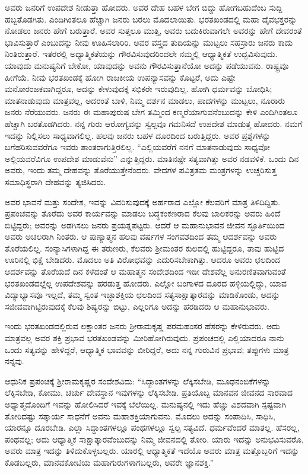 ಅವರು ಜನರಿಗೆ ಉಪದೇಶ ನೀಡುತ್ತಾ ಹೋದರು. ಅವರ ದೇಹ ಬಹಳ ಬೇಗ ಬಿದ್ದು ಹೋಗಬಹುದೆಂಬ ಸುದ್ದಿ ಹಬ್ಬತೊಡಗಿತು. ಎಂದಿಗಿಂತಲೂ ಹೆಚ್ಚಾಗಿ ಜನರು ಬರಲು ಮೊದಲಾಯಿತು. ಭರತಖಂಡದಲ್ಲಿ ಮಹಾ ದೈವಭಕ್ತರನ್ನು ನೋಡಲು ಜನರು ಹೇಗೆ ಬರುತ್ತಾರೆ. ಅವರ ಸುತ್ತಲೂ ಮುತ್ತಿ, ಅವರು ಬದುಕಿರುವಾಗಲೇ ಅವರನ್ನು ಹೇಗೆ ದೇವರಂತೆ ಭಾವಿಸುತ್ತಾರೆ ಎಂಬುದನ್ನು ನೀವು ಊಹಿಸಲಾರಿರಿ. ಅವರ ವಸ್ತ್ರದ ತುದಿಯನ್ನು ಮುಟ್ಟಲು ಸಹಸ್ರಾರು ಜನರು ಕಾದು ನಿಂತಿರುತ್ತಾರೆ. ಇತರರಲ್ಲಿ ಅಧ್ಯಾತ್ಮಿಕತೆಯನ್ನು ಗೌರವಿಸುವುದರಿಂದಲೇ ನಮ್ಮಲ್ಲಿ ಆಧ್ಯಾತ್ಮಿಕತೆ ಉದ್ಭವಿಸುವುದು. ಯಾವುದು ಮನುಷ್ಯನಿಗೆ ಬೇಕೋ, ಯಾವುದನ್ನು ಅವನು ಗೌರವಿಸುತ್ತಾನೆಯೋ ಅದನ್ನು ಪಡೆಯುವನು. ರಾಷ್ಟ್ರವೂ ಹೀಗೆಯೆ. ನೀವು ಭರತಖಂಡಕ್ಕೆ ಹೋಗಿ ರಾಜಕೀಯ ಉಪನ್ಯಾಸವನ್ನು ಕೊಟ್ಟರೆ, ಅದು ಎಷ್ಟೇ ಮನೋರಂಜಕವಾಗಿದ್ದರೂ, ಅದನ್ನು ಕೇಳುವುದಕ್ಕೆ ಸಭಿಕರೇ ಇರುವುದಿಲ್ಲ. ಹೋಗಿ ಧರ್ಮವನ್ನು ಬೋಧಿಸಿ; ಮಾತನಾಡುವುದು ಮಾತ್ರವಲ್ಲ, ಅದರಂತೆ ಬಾಳಿ, ನಿಮ್ಮ ದರ್ಶನ ಮಾಡಲು, ಪಾದಗಳನ್ನು ಮುಟ್ಟಲು, ನೂರಾರು ಜನರು ನೆರೆಯುವರು. ಜನರು ಈ ಮಹಾಪುರುಷ ಬೇಗ ತಮ್ಮಿಂದ ಕಣ್ಮರೆಯಾಗುವನೆಂಬುದನ್ನು ಕೇಳಿ ಎಂದಿಗಿಂತಲೂ ಹೆಚ್ಚಾಗಿ ಬರತೊಡಗಿದರು. ನನ್ನ ಗುರು ಆರೋಗ್ಯವನ್ನು ಸ್ವಲ್ಪವೂ ಗಮನಿಸದೆ ಉಪದೇಶ ಮಾಡುತ್ತ ಹೋದರು. ನಮಗೆ ಇದನ್ನು ನಿಲ್ಲಿಸಲು ಸಾಧ್ಯವಾಗಲಿಲ್ಲ. ಹಲವು ಜನರು ಬಹಳ ದೂರದಿಂದ ಬರುತ್ತಿದ್ದರು. ಅವರ ಪ್ರಶ್ನೆಗಳನ್ನು ಬಗೆಹರಿಸುವವರೆಗೂ ಇವರು ಶಾಂತರಾಗುತ್ತಿರಲಿಲ್ಲ. “ಎಲ್ಲಿಯವರೆಗೆ ನನಗೆ ಮಾತನಾಡುವುದು ಸಾಧ್ಯವೋ ಅಲ್ಲಿಯವರೆವಿಗೂ ಉಪದೇಶ ಮಾಡುವೆನು” ಎನ್ನುತ್ತಿದ್ದರು. ಮಾತಿನಷ್ಟೇ ಸತ್ಯವಾಗಿತ್ತು ಅವರ ನಡವಳಿಕೆ. ಒಂದು ದಿನ ಅವರು, ಇಂದು ತಮ್ಮ ದೇಹವನ್ನು ತೊರೆಯುತ್ತೇನೆಂದರು. ವೇದಗಳ ಪವಿತ್ರತಮ ಮಂತ್ರಗಳನ್ನು ಉಚ್ಚರಿಸುತ್ತ ಸಮಾಧಿಸ್ಥರಾಗಿ ದೇಹವನ್ನು ತ್ಯಜಿಸಿದರು.

ಅವರ ಭಾವನೆ ಮತ್ತು ಸಂದೇಶ, ಇವನ್ನು ವಿವರಿಸುವುದಕ್ಕೆ ಅರ್ಹರಾದ ಎಲ್ಲೋ ಕೆಲವರಿಗೆ ಮಾತ್ರ ತಿಳಿದಿದ್ದಿತು. ಪ್ರಪಂಚವನ್ನು ತೊರೆದು ಅವರ ಕಾರ್ಯವನ್ನು ಮಾಡಲು ಬದ್ಧಕಂಕಣರಾದ ಕೆಲವು ಬಾಲಕರನ್ನು ಅವರು ಹಿಂದೆ ಬಿಟ್ಟಿದ್ದರು; ಅವರನ್ನು ಅಡಗಿಸಲು ಜನರು ಪ್ರಯತ್ನಪಟ್ಟರು. ಆದರೆ ಆ ಮಹಾನುಭಾವನ ಜೀವನ ಸ್ಫೂರ್ತಿಯಿಂದ ಅವರು ಅಚಲರಾಗಿ ನಿಂತರು. ಆ ಪುಣ್ಯಾತ್ಮನ ಹಲವು ವರ್ಷಗಳ ಸಂಗವಶದಿಂದ ತಮ್ಮ ಆದರ್ಶವನ್ನು ಅವರು ತೊರೆಯಲಿಲ್ಲ. ಸಂನ್ಯಾಸಿಗಳಾಗಿದ್ದ ಈ ತರುಣರು, ಕೆಲವರು ಶ‍್ರೀಮಂತರ ಕುಲದಲ್ಲಿ ಹುಟ್ಟಿದ್ದರೂ, ತಾವು ಹುಟ್ಟಿದ ಊರಿನಲ್ಲಿ ಭಿಕ್ಷೆ ಬೇಡಿದರು. ಮೊದಲು ಅತಿ ವಿರೋಧವನ್ನು ಎದುರಿಸಬೇಕಾಗಿತ್ತು. ಆದರೂ ಅವರು ಛಲದಿಂದ ಆದರ್ಶವನ್ನು ತೊರೆಯದೆ ದಿನ ಕಳೆದಂತೆ ಆ ಮಹಾತ್ಮನ ಸಂದೇಶದಿಂದ ಇಡೀ ದೇಶವೆಲ್ಲ ಅನುರಣಿತವಾಗುವಂತೆ ಭರತಖಂಡದಲ್ಲೆಲ್ಲ ಉಪದೇಶವನ್ನು ಹರಡುತ್ತ ಹೋದರು. ಎಲ್ಲೋ ಬಂಗಾಳದ ದೂರದ ಹಳ್ಳಿಯಲ್ಲಿದ್ದು, ಯಾವ ವಿದ್ಯಾಭ್ಯಾಸವೂ ಇಲ್ಲದೆ, ತಮ್ಮ ಸ್ವಂತ ಇಚ್ಛಾಶಕ್ತಿಯ ಛಲದಿಂದ ಸತ್ಯಸಾಕ್ಷಾತ್ಕಾರವನ್ನು ಮಾಡಿಕೊಂಡು, ಅದನ್ನು ಸಜೀವವಾಗಿಟ್ಟಿರುವುದಕ್ಕೆ ಕೆಲವು ಶಿಷ್ಯರನ್ನು ಬಿಟ್ಟು, ಎಲ್ಲರಿಗೂ ಅದನ್ನು ಹರಡಿದರು ಆ ಮಹಾನುಭಾವರು.

ಇಂದು ಭರತಖಂಡದಲ್ಲಿರುವ ಲಕ್ಷಾಂತರ ಜನರು ಶ‍್ರೀರಾಮಕೃಷ್ಣ ಪರಮಹಂಸರ ಹೆಸರನ್ನು ಕೇಳಿರುವರು. ಅದು ಮಾತ್ರವಲ್ಲ ಅವರ ಶಕ್ತಿ ಪ್ರಭಾವ ಭರತಖಂಡವನ್ನು ಮೀರಿಹೋಗಿರುವುದು. ಪ್ರಪಂಚದಲ್ಲಿ ಎಲ್ಲಿಯಾದರೂ ನಾನು ಒಂದು ಸತ್ಯವನ್ನು ಹೇಳಿದ್ದರೆ, ಆಧ್ಯಾತ್ಮಿಕ ಭಾವವನ್ನು ಬೀರಿದ್ದರೆ, ಅದು ನನ್ನ ಗುರುವಿನ ಪ್ರಭಾವ; ತಪ್ಪುಗಳು ಮಾತ್ರ ನನ್ನವು.

ಆಧುನಿಕ ಪ್ರಪಂಚಕ್ಕೆ ಶ‍್ರೀರಾಮಕೃಷ್ಣರ ಸಂದೇಶವಿದು: “ಸಿದ್ಧಾಂತಗಳನ್ನು ಲೆಕ್ಕಿಸಬೇಡಿ, ಮೂಢನಂಬಿಕೆಗಳನ್ನು ಲೆಕ್ಕಿಸಬೇಡಿ, ಕೋಮು, ಚರ್ಚು ದೇವಸ್ಥಾನ ಇವುಗಳನ್ನು ಲೆಕ್ಕಿಸಬೇಡಿ. ಪ್ರತಿಯೊಬ್ಬ ಮಾನವನ ಜೀವನದ ಸಾರವಾದ ಅಧ್ಯಾತ್ಮದೊಂದಿಗೆ ಇವನ್ನು ಹೋಲಿಸಿದರೆ ಇವಕ್ಕೆ ಬೆಲೆಯಿಲ್ಲ. ಮನುಷ್ಯನಲ್ಲಿ ಇದು ಹೆಚ್ಚು ವಿಶದವಾಗಿ ಸ್ಪಷ್ಟವಾಗಿ ತೋರಿದಷ್ಟು ಸತ್ಕಾರ್ಯ ಸಾಧನೆಗೆ ಅವನು ಮಹಾಶಕ್ತಿಯಾಗುವನು. ಮೊದಲು ಅದನ್ನು ಸಂಪಾದಿಸಿ, ಸಾಧಿಸಿ, ಯಾರನ್ನೂ ದೂರಬೇಡಿ. ಎಲ್ಲಾ ಸಿದ್ಧಾಂತಗಳಲ್ಲೂ ಪಂಥಗಳಲ್ಲೂ ಸ್ವಲ್ಪ ಸತ್ಯವಿದೆ. ಧರ್ಮವೆಂದರೆ ಮಾತಲ್ಲ. ಹೆಸರಲ್ಲ, ಪಂಥವಲ್ಲ; ಅದು ಆಧ್ಯಾತ್ಮಿಕ ಸಾಕ್ಷಾತ್ಕಾರವೆಂಬುದನ್ನು ನಿಮ್ಮ ಜೀವನದಲ್ಲಿ ತೋರಿ. ಯಾರು ಇದನ್ನು ಅನುಭವಿಸುವರೊ, ಅವರು ಮಾತ್ರ ಇದನ್ನು ತಿಳಿದುಕೊಳ್ಳಬಲ್ಲರು. ಯಾರಲ್ಲಿ ಆಧ್ಯಾತ್ಮಿಕತೆ ಇದೆಯೊ ಅವರು ಮಾತ್ರ ಮತ್ತೊಬ್ಬರಿಗೆ ಇದನ್ನು ಕೊಡಬಲ್ಲರು, ಮಾನವಕೋಟಿಯ ಮಹಾಗುರುಗಳಾಗಬಲ್ಲರು, ಅವರೇ ಜ್ಞಾನಶಕ್ತಿ.”

